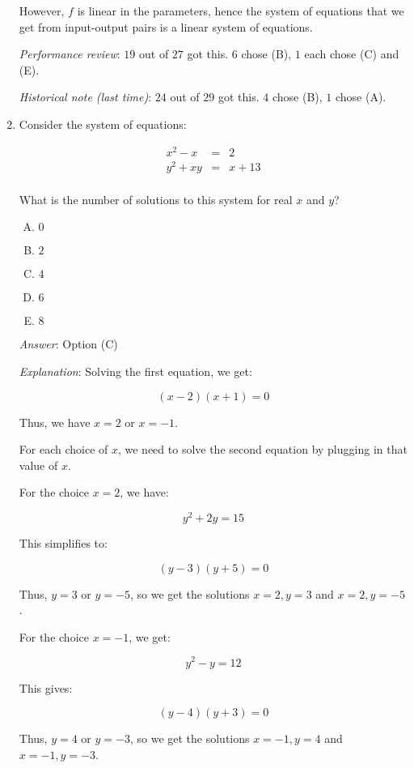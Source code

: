 \documentclass[10pt]{amsart}
\begin{document}
\begin{enumerate}
  However, $f$ is linear in the parameters, hence the system of
  equations that we get from input-output pairs is a linear system of
  equations.

  {\em Performance review}: $19$ out of $27$ got this. $6$ chose (B),
  $1$ each chose (C) and (E).

  {\em Historical note (last time)}: $24$ out of $29$ got this. $4$ chose (B),
  $1$ chose (A).
\item Consider the system of equations:

  \begin{eqnarray*}
    x^2 - x & = & 2 \\
    y^2 + xy & = & x + 13 \\
  \end{eqnarray*}

  What is the number of solutions to this system for real $x$ and $y$?

  \begin{enumerate}[(A)]
  \item $0$
  \item $2$
  \item $4$
  \item $6$
  \item $8$
  \end{enumerate}
  \vspace{0.6in}
  
  {\em Answer}: Option (C)

  {\em Explanation}: Solving the first equation, we get:

  $$(x - 2)(x + 1) = 0$$

  Thus, we have $x = 2$ or $x = -1$.

  For each choice of $x$, we need to solve the second equation by
  plugging in that value of $x$.

  For the choice $x = 2$, we have:

  $$y^2 + 2y = 15$$

  This simplifies to:

  $$(y - 3)(y + 5) = 0$$

  Thus, $y = 3$ or $y = -5$, so we get the solutions $x = 2, y = 3$
  and $x = 2, y = -5$.

  For the choice $x = -1$, we get:

  $$y^2 - y = 12$$

  This gives:

  $$(y - 4)(y + 3) = 0$$

  Thus, $y = 4$ or $y = -3$, so we get the solutions $x = -1, y = 4$
  and $x = -1, y= -3$.


\end{enumerate}
\end{document}

